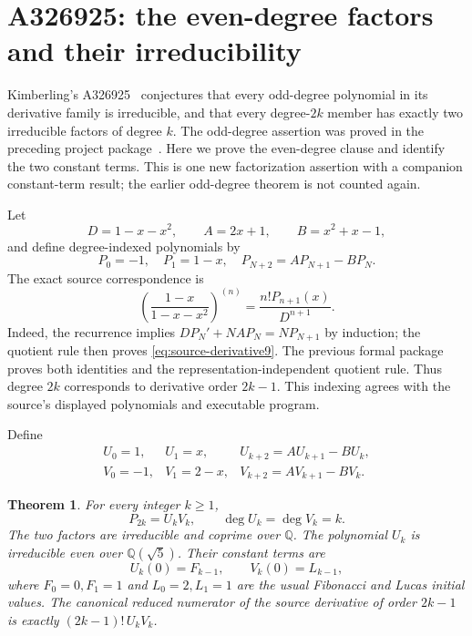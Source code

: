 \documentclass[11pt]{article}
\newtheorem{theorem}{Theorem}[section]
\newcommand{\Q}{\mathbb Q}
\begin{document}
\section{A326925: the even-degree factors and their irreducibility}
\label{sec:even}

Kimberling's A326925~\cite{A326925} conjectures that every odd-degree
polynomial in its derivative family is irreducible, and that every
degree-$2k$ member has exactly two irreducible factors of degree $k$.
The odd-degree assertion was proved in the preceding project
package~\cite{previous}. Here we prove the even-degree clause and identify
the two constant terms. This is one new factorization assertion with a
companion constant-term result; the earlier odd-degree theorem is not
counted again.

Let
\[
 D=1-x-x^2,\qquad A=2x+1,\qquad B=x^2+x-1,
\]
and define degree-indexed polynomials by
\[
 P_0=-1,\quad P_1=1-x,\quad P_{N+2}=AP_{N+1}-BP_N.
\]
The exact source correspondence is
\begin{equation}\label{eq:source-derivative9}
 \left(\frac{1-x}{1-x-x^2}\right)^{(n)}
 =\frac{n!P_{n+1}(x)}{D^{n+1}}.
\end{equation}
Indeed, the recurrence implies
$DP_N'+NA P_N=N P_{N+1}$ by induction; the quotient rule then proves
\eqref{eq:source-derivative9}. The previous formal package proves both
identities and the representation-independent quotient rule. Thus
degree $2k$ corresponds to derivative order $2k-1$. This indexing
agrees with the source's displayed polynomials and executable program.

Define
\begin{equation}\label{eq:two-factors9}
\begin{array}{lll}
 U_0=1,&U_1=x,&U_{k+2}=AU_{k+1}-BU_k,\\
 V_0=-1,&V_1=2-x,&V_{k+2}=AV_{k+1}-BV_k.
\end{array}
\end{equation}

\begin{theorem}\label{thm:even9}
For every integer $k\ge1$,
\[
 P_{2k}=U_kV_k,
 \qquad \deg U_k=\deg V_k=k.
\]
The two factors are irreducible and coprime over $\Q$. The polynomial
$U_k$ is irreducible even over $\Q(\sqrt5)$.
Their constant terms are
\[
 U_k(0)=F_{k-1},\qquad V_k(0)=L_{k-1},
\]
where $F_0=0,F_1=1$ and $L_0=2,L_1=1$ are the usual Fibonacci and Lucas
initial values. The canonical reduced numerator of the source
derivative of order $2k-1$ is exactly $(2k-1)!\,U_kV_k$.
\end{theorem}
\end{document}
